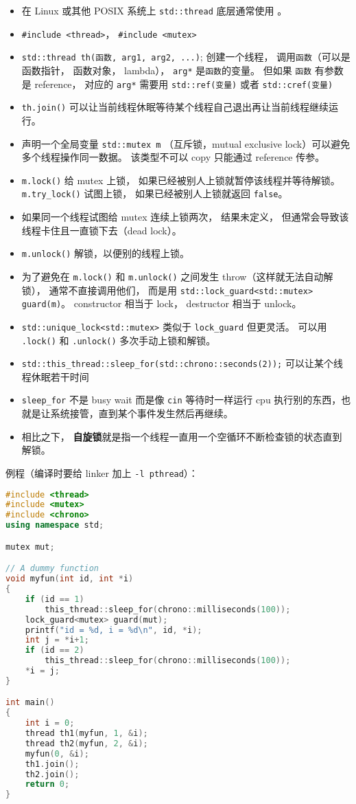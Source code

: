 
\begin{itemize}
\item 在 Linux 或其他 POSIX 系统上 \verb`std::thread` 底层通常使用 。
\item \verb`#include <thread>`， \verb`#include <mutex>`
\item \verb`std::thread th(函数, arg1, arg2, ...)`; 创建一个线程， 调用\verb`函数`（可以是函数指针， 函数对象， lambda）， \verb`arg*` 是\verb`函数`的变量。 但如果 \verb`函数` 有参数是 reference， 对应的 \verb`arg*` 需要用 \verb`std::ref(变量)` 或者 \verb`std::cref(变量)`
\item \verb`th.join()` 可以让当前线程休眠等待某个线程自己退出再让当前线程继续运行。
\item 声明一个全局变量 \verb`std::mutex m` （互斥锁，mutual exclusive lock）可以避免多个线程操作同一数据。 该类型不可以 copy 只能通过 reference 传参。
\item \verb`m.lock()` 给 mutex 上锁， 如果已经被别人上锁就暂停该线程并等待解锁。 \verb`m.try_lock()` 试图上锁， 如果已经被别人上锁就返回 \verb`false`。
\item 如果同一个线程试图给 mutex 连续上锁两次， 结果未定义， 但通常会导致该线程卡住且一直锁下去（dead lock）。
\item \verb`m.unlock()` 解锁，以便别的线程上锁。
\item 为了避免在 \verb`m.lock()` 和 \verb`m.unlock()` 之间发生 throw（这样就无法自动解锁）， 通常不直接调用他们， 而是用 \verb`std::lock_guard<std::mutex> guard(m)`。 constructor 相当于 lock， destructor 相当于 unlock。
\item \verb`std::unique_lock<std::mutex>` 类似于 \verb`lock_guard` 但更灵活。 可以用 \verb`.lock()` 和 \verb`.unlock()` 多次手动上锁和解锁。
\item \verb`std::this_thread::sleep_for(std::chrono::seconds(2));` 可以让某个线程休眠若干时间
\item \verb`sleep_for` 不是 busy wait 而是像 \verb`cin` 等待时一样运行 cpu 执行别的东西，也就是让系统接管，直到某个事件发生然后再继续。
\item 相比之下， \textbf{自旋锁}就是指一个线程一直用一个空循环不断检查锁的状态直到解锁。
\end{itemize}

例程（编译时要给 linker 加上 \verb`-l pthread`）：
\begin{lstlisting}[language=cpp]
#include <thread>
#include <mutex>
#include <chrono>
using namespace std;

mutex mut;

// A dummy function
void myfun(int id, int *i)
{
    if (id == 1)
        this_thread::sleep_for(chrono::milliseconds(100));
    lock_guard<mutex> guard(mut);
    printf("id = %d, i = %d\n", id, *i);
    int j = *i+1;
    if (id == 2)
        this_thread::sleep_for(chrono::milliseconds(100));
    *i = j;
}

int main()
{
    int i = 0;
    thread th1(myfun, 1, &i);
    thread th2(myfun, 2, &i);
    myfun(0, &i);
    th1.join();
    th2.join();
    return 0;
}
\end{lstlisting}


